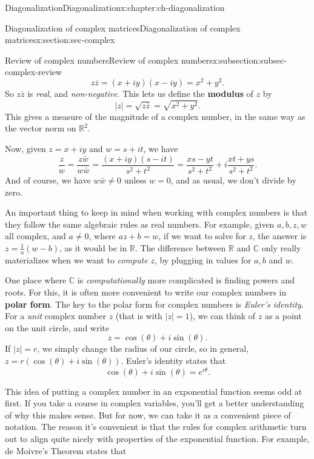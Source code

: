 \documentclass[oneside,10pt,]{book}
\newcommand{\terminology}[1]{\textbf{#1}}
\numberwithin{equation}{section}
\newcommand{\R}{\mathbb{R}}
\renewcommand{\C}{\mathbb{C}}
\newcommand{\abs}[1]{\lvert #1\rvert}
\newcommand{\bz}{\overline{z}}
\begin{document}
\begin{chapterptx}{Diagonalization}{}{Diagonalization}{}{}{x:chapter:ch-diagonalization}
\begin{sectionptx}{Diagonalization of complex matrices}{}{Diagonalization of complex matrices}{}{}{x:section:sec-complex}
\begin{subsectionptx}{Review of complex numbers}{}{Review of complex numbers}{}{}{x:subsection:subsec-complex-review}
\begin{equation*}
z\bz = (x+iy)(x-iy)=x^2+y^2\text{.}
\end{equation*}
So \(z\bz\) is \emph{real}, and \emph{non-negative}. This lets us define the \terminology{modulus} of \(z\) by%
\begin{equation*}
\abs{z} = \sqrt{z\bz} = \sqrt{x^2+y^2}\text{.}
\end{equation*}
This gives a measure of the magnitude of a complex number, in the same way as the vector norm on \(\R^2\).%
\par
Now, given \(z=x+iy\) and \(w=s+it\), we have%
\begin{equation*}
\frac{z}{w}=\frac{z\bar{w}}{w\bar{w}} = \frac{(x+iy)(s-it)}{s^2+t^2} = \frac{xs-yt}{s^2+t^2}+i\frac{xt+ys}{s^2+t^2}\text{.}
\end{equation*}
And of course, we have \(w\bar{w}\neq 0\) unless \(w=0\), and as usual, we don't divide by zero.%
\par
An important thing to keep in mind when working with complex numbers is that they follow the same algebraic rules as real numbers. For example, given \(a,b,z,w\) all complex, and \(a\neq 0\), where \(az+b=w\), if we want to solve for \(z\), the answer is \(z=\frac1a(w-b)\), as it would be in \(\R\). The difference between \(\R\) and \(\C\) only really materializes when we want to \emph{compute} \(z\), by plugging in values for \(a,b\) and \(w\).%
\par
One place where \(\C\) is \emph{computationally} more complicated is finding powers and roots. For this, it is often more convenient to write our complex numbers in \terminology{polar form}. The key to the polar form for complex numbers is \emph{Euler's identity}. For a \emph{unit} complex number \(z\) (that is with \(\abs{z}=1\)), we can think of \(z\) as a point on the unit circle, and write%
\begin{equation*}
z = \cos(\theta)+i\sin(\theta)\text{.}
\end{equation*}
If \(\abs{z}=r\), we simply change the radius of our circle, so in general, \(z = r(\cos(\theta)+i\sin(\theta))\). Euler's identity states that%
\begin{equation}
\cos(\theta)+i\sin(\theta)=e^{i\theta}\text{.}\label{x:men:eq-euler}
\end{equation}
%
\par
This idea of putting a complex number in an exponential function seems odd at first. If you take a course in complex variables, you'll get a better understanding of why this makes sense. But for now, we can take it as a convenient piece of notation. The reason it's convenient is that the rules for complex arithmetic turn out to align quite nicely with properties of the exponential function. For example, de Moivre's Theorem states that%

\end{subsectionptx}
\end{sectionptx}
\end{chapterptx}
\end{document}
